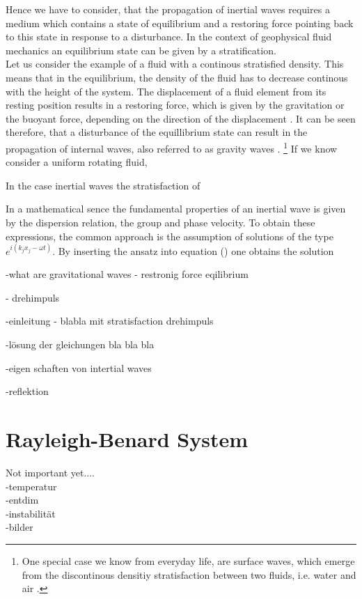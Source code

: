 Hence we have to consider, that the propagation of inertial waves requires a medium which contains a state of equilibrium and
a restoring force pointing back to this state in response to a disturbance.
In the context of geophysical fluid mechanics an equilibrium state can be given by a stratification.\\
Let us consider the example of a fluid with a continous stratisfied density. This means that in the equilibrium, the density of the fluid has to decrease
continous with the height of the system. The displacement of a fluid element from its resting position results in a restoring force, which is given by the
gravitation or the buoyant force, depending on the direction of the displacement \cite{}.
It can be seen therefore, that a disturbance of the equillibrium state can result in the propagation of internal waves, also referred to as gravity waves \cite{}.
\footnote{One special case we know from everyday life, are surface waves, which emerge
from the  discontinous densitiy stratisfaction between two fluids, i.e. water and air \cite{}.}
If we know consider a uniform rotating fluid,



In the case inertial waves the stratisfaction of





In a mathematical sence the fundamental properties of an inertial wave is given by the dispersion relation, the group and phase velocity.
To obtain these expressions, the common approach is the assumption of solutions of the type $e^{i(k_j x_j - \omega t)}$.
By inserting the ansatz into equation () one obtains the solution




-what are gravitational waves
- restronig force eqilibrium

- drehimpuls

-einleitung - blabla mit stratisfaction drehimpuls

-lösung der gleichungen  bla bla bla

-eigen schaften von intertial waves

-reflektion

\newpage
\section{Rayleigh-Benard System}
Not important yet.... \\
-temperatur\\
-entdim\\
-instabilität\\
-bilder\\





